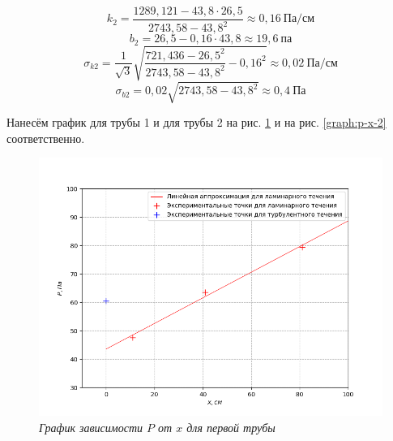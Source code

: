 \documentclass[a4paper,12pt]{article}
\begin{document}
\begin{equation*}
    k_2 = \frac{1289,121 - 43,8 \cdot 26,5}{2743,58 - {43,8}^2} \approx 0,16 \ \text{Па}/\text{см}
\end{equation*}
\begin{equation*}
    b_2 = 26,5 - 0,16 \cdot 43,8 \approx 19,6 \ \text{па}
\end{equation*}
\begin{equation*}
    \sigma_{k2} = \frac{1}{\sqrt{3}} \sqrt{\frac{721,436 - {26,5}^2}{2743,58 - {43,8}^2} - {0,16}^2} \approx 0,02 \ \text{Па}/\text{см}
\end{equation*}
\begin{equation*}
    \sigma_{b2} = 0,02 \sqrt{2743,58 - {43,8}^2} \approx 0,4 \ \text{Па}
\end{equation*}

Нанесём график для трубы 1 и для трубы 2 на рис. \ref{graph:p-x-1} и на рис. \ref{graph:p-x-2} соответственно.

\begin{figure}[h!]
        \centering
	\includegraphics[width=1\textwidth]{graph_p-x_1.png}
	\caption{\textit{График зависимости $P$ от $x$ для первой трубы}}
	\label{graph:p-x-1}
\end{figure}
\end{document}
